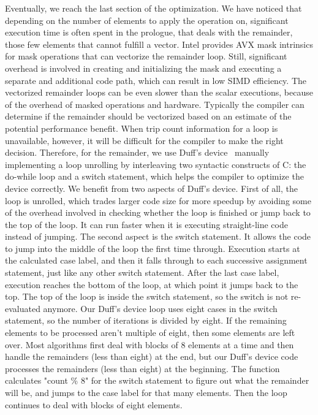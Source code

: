 \documentclass[5p,times,twocolumn]{elsarticle}
\begin{document}
Eventually, we reach the last section of the optimization. We have
noticed that depending on the number of elements to apply the
operation on, significant execution time is often spent in the
prologue, that deals with the remainder, those few elements that cannot fulfill a vector.
Intel provides AVX mask intrinsics for mask operations that can vectorize the remainder loop.
Still, significant overhead is involved in creating and initializing the mask and
executing a separate and additional code path, which can result in low SIMD efficiency.
%
The vectorized remainder loops can be even slower than the scalar executions,
because of the overhead of masked operations and hardware.
%
Typically the compiler can determine if the remainder should be vectorized
based on an estimate of the potential performance benefit. When trip count information for a
loop is unavailable, however, it will be difficult for the
compiler to make the right decision.
%
Therefore, for the remainder, we use Duff's
device~\cite{wiki:duff} manually implementing a loop unrolling by
interleaving two syntactic constructs of C: the do-while loop and a
switch statement, which helps the compiler to optimize the device
correctly.
%
We benefit from two aspects of Duff's device. First of all, the loop is unrolled,
which trades larger code size for more speedup by avoiding some of the overhead
involved in checking whether the loop is finished or jump back to the
top of the loop.
It can run faster when it is executing straight-line code instead of jumping.
The second aspect is the switch statement. It allows the code to jump into the middle of the
loop the first time through.
Execution starts at the calculated case label, and then it falls through to each successive
assignment statement, just like any other switch statement.
%
After the last case label, execution reaches the bottom of the loop, at which point it jumps back to the top. The top of the loop is inside the switch statement, so the switch is not re-evaluated anymore.
%
Our Duff's device loop uses eight cases in the switch statement, so the number of iterations is divided by eight.
If the remaining elements to be processed aren't multiple of eight, then some elements are left over.
Most algorithms first deal with blocks of 8 elements at a time and then handle the remainders (less than eight) at the end,
but our Duff's device code processes the remainders (less than eight) at the beginning.
The function calculates "count \% 8" for the switch statement to figure out what the remainder will be, and jumps to the case label for that many elements.
Then the loop continues to deal with blocks of eight elements.
\end{document}
